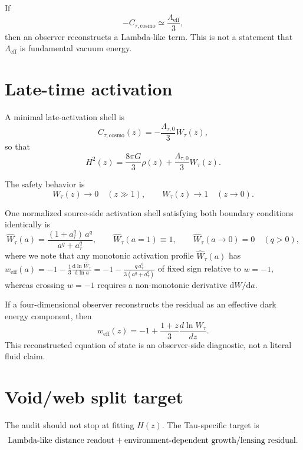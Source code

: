 \documentclass[11pt]{article}
\begin{document}
If
\begin{equation}
-C_{\tau,\mathrm{cosmo}}\simeq \frac{\Lambda_{\mathrm{eff}}}{3},
\end{equation}
then an observer reconstructs a Lambda-like term. This is not a statement that
\(\Lambda_{\mathrm{eff}}\) is fundamental vacuum energy.

\section{Late-time activation}

A minimal late-activation shell is
\begin{equation}
C_{\tau,\mathrm{cosmo}}(z)
=
-\frac{\Lambda_{\tau,0}}{3}W_\tau(z),
\end{equation}
so that
\begin{equation}
H^2(z)
=
\frac{8\pi G}{3}\rho(z)
+\frac{\Lambda_{\tau,0}}{3}W_\tau(z).
\end{equation}

The safety behavior is
\[
W_\tau(z)\to 0 \quad (z\gg 1), \qquad
W_\tau(z)\to 1 \quad (z\to 0).
\]

One normalized source-side activation shell satisfying both boundary conditions identically is
\begin{equation}
\widehat{W}_\tau(a)=\frac{(1+a_\tau^q)\,a^q}{a^q+a_\tau^q}, \qquad \widehat{W}_\tau(a=1)\equiv 1, \qquad \widehat{W}_\tau(a\to 0)=0 \quad (q>0),
\end{equation}
where we note that any monotonic activation profile $\widehat{W}_\tau(a)$ has $w_{\mathrm{eff}}(a) = -1 - \frac{1}{3}\frac{\mathrm{d}\ln\widehat{W}_\tau}{\mathrm{d}\ln a} = -1 - \frac{q\,a_\tau^q}{3(a^q+a_\tau^q)}$ of fixed sign relative to $w=-1$, whereas crossing $w=-1$ requires a non-monotonic derivative $\mathrm{d}W/\mathrm{d}a$.

If a four-dimensional observer reconstructs the residual as an effective dark
energy component, then
\begin{equation}
w_{\mathrm{eff}}(z)
=
-1+\frac{1+z}{3}\frac{d\ln W_\tau}{dz}.
\end{equation}
This reconstructed equation of state is an observer-side diagnostic, not a
literal fluid claim.

\section{Void/web split target}

The audit should not stop at fitting \(H(z)\). The Tau-specific target is
\begin{equation}
\hbox{Lambda-like distance readout}
+
\hbox{environment-dependent growth/lensing residual}.
\end{equation}
\end{document}
